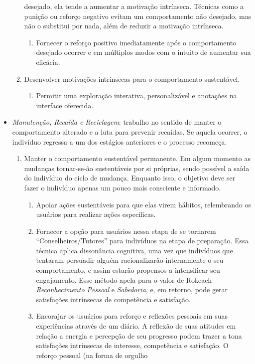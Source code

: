 \begin{itemize}
\begin{enumerate}
desejado, ela tende a aumentar a motivação intrínseca. Técnicas como a punição ou
reforço negativo evitam um comportamento não desejado, mas não o substitui por
nada, além de reduzir a motivação intrínseca.
\begin{enumerate}
\item Fornecer o reforço positivo imediatamente após o comportamento desejado
ocorrer e em múltiplos modos com o intuito de aumentar sua eficácia.
\end{enumerate}
\item Desenvolver motivações intrínsecas para o comportamento sustentável.
\begin{enumerate}
\item Permitir uma exploração interativa, personalizável e anotações na
interface oferecida.
\end{enumerate}
\end{enumerate}
\item \emph{Manutenção, Recaída e Reciclagem}: trabalho no sentido de manter o
comportamento alterado e a luta para prevenir recaídas. Se aquela ocorrer, o
indivíduo regressa a um dos estágios anteriores e o processo recomeça.
\begin{enumerate}
\item Manter o comportamento sustentável permanente. Em algum momento as
mudanças tornar-se-ão sustentáveis por si próprias, sendo possível a saída
do indivíduo do ciclo de mudança. Enquanto isso, o objetivo deve ser fazer o
indivíduo apenas um pouco mais consciente e informado.
\begin{enumerate}
\item Apoiar ações sustentáveis para que elas virem hábitos, relembrando os
usuários para realizar ações específicas.
\item Fornecer a opção para usuários nessa etapa de se tornarem
``Conselheiros/Tutores'' para indivíduos na etapa de preparação. Essa técnica
aplica dissonância cognitiva, uma vez que indivíduos que tentaram persuadir
alguém racionalizarão internamente o seu comportamento, e assim estarão
propensos a intensificar seu engajamento. Esse método apela para o valor de
Rokeach \emph{Reconhecimento Pessoal} e \emph{Sabedoria}, e, em retorno, pode
gerar satisfações intrínsecas de competência e satisfação.
\item Encorajar os usuários para reforço e reflexões pessoais em suas
experiências através de um diário. A reflexão de suas atitudes em relação a
energia e percepção de seu progresso podem trazer a tona satisfações intrínsecas
de interesse, competência e satisfação. O reforço pessoal (na forma de orgulho

\end{enumerate}
\end{enumerate}
\end{itemize}
